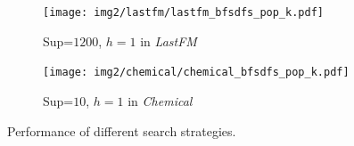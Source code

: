 \begin{figure}[b]
	\centering

	\begin{subfigure}[b]{0.25\textwidth}
		\texttt{[image: img2/lastfm/lastfm\_bfsdfs\_pop\_k.pdf]}
		\caption{\scriptsize {\sf Sup}=$1200$, $h=1$ in {\em LastFM}}
		\label{fig:lastfm_bfsdfs_pop_k}
	\end{subfigure}%

	\begin{subfigure}[b]{0.25\textwidth}
		\texttt{[image: img2/chemical/chemical\_bfsdfs\_pop\_k.pdf]}
		\caption{\scriptsize{\sf Sup}=$10$, $h=1$ in {\em Chemical}}
		\label{fig:chemical_bfsdfs_pop_k}
	\end{subfigure}
	\vspace{-2mm}
	\caption{Performance of different search strategies.}
	\label{fig:dbfs}
	\vspace{-2mm}
\end{figure}

